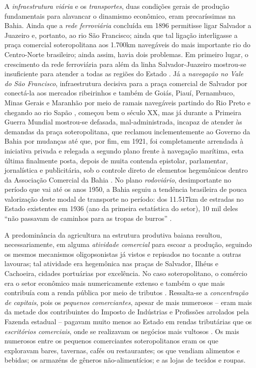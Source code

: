 A \textit{infraestrutura viária} e os \textit{transportes}, duas condições gerais de produção fundamentais para alavancar o dinamismo econômico, eram precaríssimas na Bahia. Ainda que a \textit{rede ferroviária} concluída em 1896 permitisse ligar Salvador a Juazeiro e, portanto, ao rio São Francisco; ainda que tal ligação interligasse a praça comercial soteropolitana aos 1.700km navegáveis do mais importante rio do Centro-Norte brasileiro; ainda assim, havia dois problemas. Em primeiro lugar, o crescimento da rede ferroviária para além da linha Salvador-Juazeiro mostrou-se insuficiente para atender a todas as regiões do Estado \cite[p.~31]{CPE1980}. Já a \textit{navegação no Vale do São Francisco}, infraestrutura decisiva para a praça comercial de Salvador por conectá-la aos mercados ribeirinhos e também de Goiás, Piauí, Pernambuco, Minas Gerais e Maranhão por meio de ramais navegáveis partindo do Rio Preto e chegando ao rio Sapão \cite[p.~220]{CUNHA2011}, começou bem o século XX, mas já durante a Primeira Guerra Mundial mostrou-se defasada, mal-administrada, incapaz de atender às demandas da praça soteropolitana, que reclamou inclementemente ao Governo da Bahia por mudanças até que, por fim, em 1921, foi completamente arrendada à iniciativa privada e relegada a segundo plano frente à navegação marítima, esta última finalmente posta, depois de muita contenda epistolar, parlamentar, jornalística e publicitária, sob o controle direto de elementos hegemônicos dentro da Associação Comercial da Bahia \cite[p.~221-223]{CUNHA2011}. No plano \textit{rodoviário}, desimportante no período que vai até os anos 1950, a Bahia seguiu a tendência brasileira de pouca valorização deste modal de transporte no período: dos 11.517km de estradas no Estado existentes em 1936 (ano da primeira estatística do setor), 10 mil deles ``não passavam de caminhos para as tropas de burros'' \cite[p.~31]{CPE1980}.

A predominância da agricultura na estrutura produtiva baiana resultou, necessariamente, em alguma \textit{atividade comercial} para escoar a produção, seguindo os mesmos mecanismos oligopsonistas já vistos e repisados no tocante a outras lavouras; tal atividade era hegemônica nas praças de Salvador, Ilhéus e Cachoeira, cidades portuárias por excelência. No caso soteropolitano, o comércio era o setor econômico mais numericamente extenso e também o que mais contribuía com a renda pública por meio de tributos \cite[p.~55]{CPE1980}. Ressalta-se a \textit{concentração de capitais}, pois os \textit{pequenos comerciantes}, apesar de mais numerosos -- eram mais da metade dos contribuintes do Imposto de Indústrias e Profissões arrolados pela Fazenda estadual -- pagavam muito menos ao Estado em rendas tributárias que os \textit{escritórios comerciais}, onde se realizavam os negócios mais vultosos \cite[p.~56]{CPE1980}. Os mais numerosos entre os pequenos comerciantes soteropolitanos eram os que exploravam bares, tavernas, cafés ou restaurantes; os que vendiam alimentos e bebidas; os armazéns de gêneros não-alimentícios; e as lojas de tecidos e roupas. 

